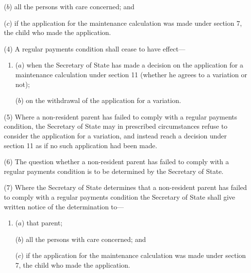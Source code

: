 \documentclass[a4paper]{article}
\begin{document}
{\begin{enumerate}
($b$) all the persons with care concerned; and

($c$) if the application for the maintenance calculation was made under section
7, the child who made the application.
\end{enumerate}

(4) A regular payments condition shall cease to have effect---
\begin{enumerate}\item[]
($a$) when the Secretary of State has made a decision on the application for a
maintenance calculation under section 11 (whether he agrees to a variation
or not);

($b$) on the withdrawal of the application for a variation.
\end{enumerate}

(5) Where a non-resident parent has failed to comply with a regular payments condition, the Secretary of State may in prescribed circumstances refuse to consider the application for a variation, and instead reach a decision under section 11 as if no such application had been made.

(6)
The question whether a non-resident parent has failed to comply with a regular payments condition is to be determined by the Secretary of State.

(7)
Where the Secretary of State determines that a non-resident parent has failed to comply with a regular payments condition the Secretary of State shall give written notice of the determination to---
\begin{enumerate}\item[]
($a$) that parent;

($b$) all the persons with care concerned; and

($c$) if the application for the maintenance calculation was made under section 7, the child who made the application.
\end{enumerate}

}
\end{document}
